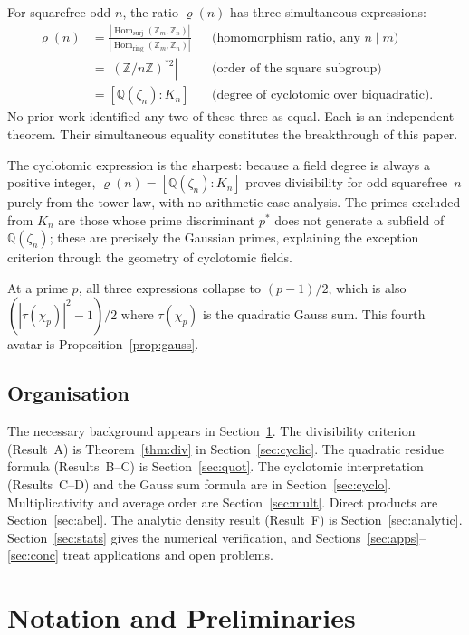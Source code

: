 \documentclass[12pt]{amsart}
\theoremstyle{bluehead}
\theoremstyle{orangehead}
\theoremstyle{greenhead}
\newcommand{\Z}{\mathbb{Z}}
\newcommand{\Q}{\mathbb{Q}}
\newcommand{\Hring}{\operatorname{Hom}_{\mathrm{ring}}}
\newcommand{\Hsurj}{\operatorname{Hom}_{\mathrm{surj}}}
\begin{document}
For squarefree odd $n$, the ratio $\varrho(n)$ has three simultaneous
expressions:
\begin{align*}
  \varrho(n)
  &= \frac{|\Hsurj(\Z_m,\Z_n)|}{|\Hring(\Z_m,\Z_n)|}
   &&\text{(homomorphism ratio, any }n\mid m\text{)}\\
  &= |(\Z/n\Z)^{*2}|
   &&\text{(order of the square subgroup)}\\
  &= [\Q(\zeta_n):K_n]
   &&\text{(degree of cyclotomic over biquadratic).}
\end{align*}
No prior work identified any two of these three as equal.  Each is an
independent theorem.  Their simultaneous equality constitutes the
breakthrough of this paper.

The cyclotomic expression is the sharpest: because a field degree is
always a positive integer, $\varrho(n)=[\Q(\zeta_n):K_n]$ proves
divisibility for odd squarefree~$n$ purely from the tower law, with no
arithmetic case analysis.  The primes excluded from $K_n$ are those
whose prime discriminant $p^*$ does not generate a subfield of
$\Q(\zeta_n)$; these are precisely the Gaussian primes, explaining the
exception criterion through the geometry of cyclotomic fields.

At a prime $p$, all three expressions collapse to $(p-1)/2$, which
is also $(|\tau(\chi_p)|^2-1)/2$ where $\tau(\chi_p)$ is the quadratic
Gauss sum.  This fourth avatar is Proposition~\ref{prop:gauss}.

\subsection*{Organisation}

The necessary background appears in Section~\ref{sec:prelim}.
The divisibility criterion (Result~A) is Theorem~\ref{thm:div}
in Section~\ref{sec:cyclic}.
The quadratic residue formula (Results~B--C) is Section~\ref{sec:quot}.
The cyclotomic interpretation (Results~C--D) and the Gauss sum formula
are in Section~\ref{sec:cyclo}.
Multiplicativity and average order are Section~\ref{sec:mult}.
Direct products are Section~\ref{sec:abel}.
The analytic density result (Result~F) is Section~\ref{sec:analytic}.
Section~\ref{sec:stats} gives the numerical verification, and
Sections~\ref{sec:apps}--\ref{sec:conc} treat applications and open problems.

\section{Notation and Preliminaries}\label{sec:prelim}
\end{document}
